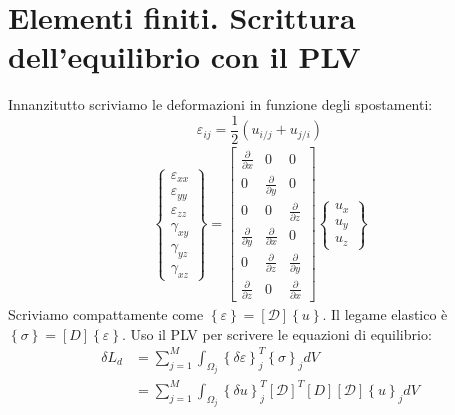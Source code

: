 \section{Elementi finiti. Scrittura dell'equilibrio con il PLV}

Innanzitutto scriviamo le deformazioni in funzione degli spostamenti:
\begin{equation*}
    \varepsilon_{ij}=\frac{1}{2}(u_{i/j}+u_{j/i})
\end{equation*}
\begin{align*}
\begin{Bmatrix}
    \varepsilon_{xx} \\
    \varepsilon_{yy} \\
    \varepsilon_{zz} \\
    \gamma_{xy} \\
    \gamma_{yz} \\
    \gamma_{xz}
\end{Bmatrix}
=
\begin{bmatrix}
    \frac{\partial}{\partial x} & 0 & 0 \\
    0 & \frac{\partial}{\partial y} & 0 \\
    0 & 0 & \frac{\partial}{\partial z} \\
    \frac{\partial}{\partial y} & \frac{\partial}{\partial x} & 0 \\
    0 & \frac{\partial}{\partial z} & \frac{\partial}{\partial y} \\
    \frac{\partial}{\partial z} & 0 & \frac{\partial}{\partial x}
\end{bmatrix}
\begin{Bmatrix}
    u_x \\
    u_y \\
    u_z
\end{Bmatrix}
\end{align*}
Scriviamo compattamente come $\left\{ \varepsilon\right\}= [\mathcal{D}]\left\{ u\right\}$. Il legame elastico è $\left\{ \sigma\right\}= [D]\left\{ \varepsilon\right\}$.
Uso il PLV per scrivere le equazioni di equilibrio:
\begin{align*}
 \delta L_{d}  &= \sum^M_{j=1} \int_{\Omega_j}     \left\{\delta\varepsilon\right\}_j^T  \left\{\sigma\right\}_j  dV\\
  &= \sum^M_{j=1} \int_{\Omega_j}     \left\{\delta u\right\}_j^T  [\mathcal{D}]^T  [D]  [\mathcal{D}]  \left\{ u\right\}_j dV\\
\end{align*}

